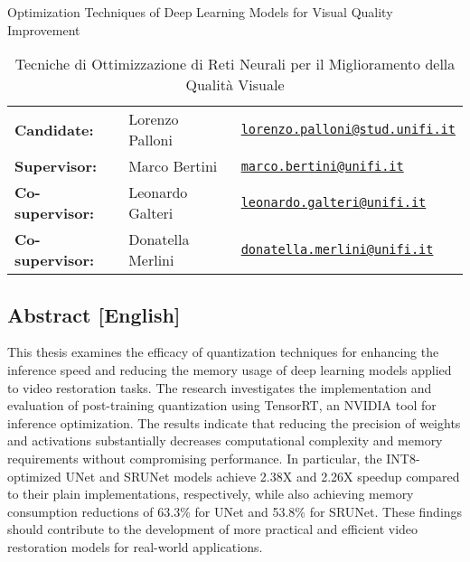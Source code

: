 \documentclass{article}
\begin{document}
\begin{table}
\centering
\caption*{Optimization Techniques of Deep Learning Models for Visual Quality Improvement}
\caption*{Tecniche di Ottimizzazione di Reti Neurali per il Miglioramento della Qualit\`a Visuale}
\begin{tabular}{lll}
\textbf{Candidate:}   & Lorenzo Palloni & \href{mailto:lorenzo.palloni@stud.unifi.it}{\texttt{lorenzo.palloni@stud.unifi.it}} \\
\textbf{Supervisor:}    & Marco Bertini & \href{mailto:marco.bertini@unifi.it}{\texttt{marco.bertini@unifi.it}} \\
\textbf{Co-supervisor:}    & Leonardo Galteri & \href{mailto:leonardo.galteri@unifi.it}{\texttt{leonardo.galteri@unifi.it}} \\
\textbf{Co-supervisor:}    & Donatella Merlini & \href{mailto:donatella.merlini@unifi.it}{\texttt{donatella.merlini@unifi.it}} \\
\end{tabular}
\end{table}

\subsection*{Abstract [English]}
This thesis examines the efficacy of quantization techniques for enhancing the inference speed and reducing the memory usage of deep learning models applied to video restoration tasks. The research investigates the implementation and evaluation of post-training quantization using TensorRT, an NVIDIA tool for inference optimization. The results indicate that reducing the precision of weights and activations substantially decreases computational complexity and memory requirements without compromising performance. In particular, the INT8-optimized UNet and SRUNet models achieve 2.38X and 2.26X speedup compared to their plain implementations, respectively, while also achieving memory consumption reductions of 63.3\% for UNet and 53.8\% for SRUNet. These findings should contribute to the development of more practical and efficient video restoration models for real-world applications.
\end{document}

